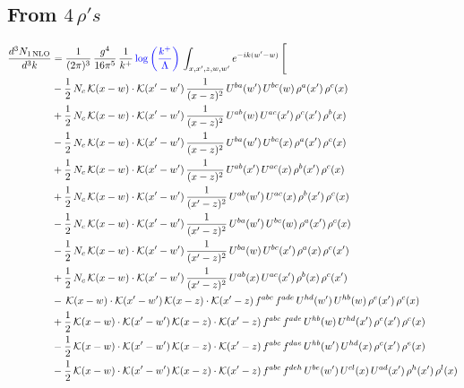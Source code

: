 \documentclass[9pt]{article}
\numberwithin{equation}{section}
\begin{document}
\subsection{From $4\, \rho's$}
\begin{align}
\frac{d^{3}N_{1\,\mathrm{NLO}}}{d^{3}k} & = \frac{1}{(2\pi)^{3}}\,\frac{g^{4}}{16\pi^{5}}\,\frac{1}{k^{+}}\,{\color{blue}\log{\left(\frac{k^{+}}{\Lambda}\right)}}\,\int_{x,x',z,w,w'}e^{-ik(w'-w)}\,\Bigg[\notag\\ & -\frac{1}{2}\,N_{c}\,\mathcal{K}(x-w)\cdot\mathcal{K}(x'-w')\,\frac{1}{(x-z)^{2}}\,U^{ba}(w')\,U^{bc}(w)\,\rho^{a}(x')\,\rho^{c}(x)\notag\\
& +\frac{1}{2}\,N_{c}\,\mathcal{K}(x-w)\cdot\mathcal{K}(x'-w')\,\frac{1}{(x-z)^{2}}\,U^{ab}(w)\,U^{ac}(x')\,\rho^{c}(x')\,\rho^{b}(x)\notag\\
& -\frac{1}{2}\,N_{c}\,\mathcal{K}(x-w)\cdot\mathcal{K}(x'-w')\,\frac{1}{(x-z)^{2}}\,U^{ba}(w')\,U^{bc}(x)\,\rho^{a}(x')\,\rho^{c}(x)\notag\\
& +\frac{1}{2}\,N_{c}\,\mathcal{K}(x-w)\cdot\mathcal{K}(x'-w')\,\frac{1}{(x-z)^{2}}\,U^{ab}(x')\,U^{ac}(x)\,\rho^{b}(x')\,\rho^{c}(x)\notag\\
& +\frac{1}{2}\,N_{c}\,\mathcal{K}(x-w)\cdot\mathcal{K}(x'-w')\,\frac{1}{(x'-z)^{2}}\,U^{ab}(w')\,U^{ac}(x)\,\rho^{b}(x')\,\rho^{c}(x)\notag\\
& -\frac{1}{2}\,N_{c}\,\mathcal{K}(x-w)\cdot\mathcal{K}(x'-w')\,\frac{1}{(x'-z)^{2}}\,U^{ba}(w')\,U^{bc}(w)\,\rho^{a}(x')\,\rho^{c}(x)\notag\\
& -\frac{1}{2}\,N_{c}\,\mathcal{K}(x-w)\cdot\mathcal{K}(x'-w')\,\frac{1}{(x'-z)^{2}}\,U^{ba}(w)\,U^{bc}(x')\,\rho^{a}(x)\,\rho^{c}(x')\notag\\
& +\frac{1}{2}\,N_{c}\,\mathcal{K}(x-w)\cdot\mathcal{K}(x'-w')\,\frac{1}{(x'-z)^{2}}\,U^{ab}(x)\,U^{ac}(x')\,\rho^{b}(x)\,\rho^{c}(x')\notag\\
& -\,\mathcal{K}(x-w)\cdot\mathcal{K}(x'-w')\,\mathcal{K}(x-z)\cdot\mathcal{K}(x'-z)\,f^{abc}\,f^{ade}\,U^{hd}(w')\,U^{hb}(w)\,\rho^{e}(x')\,\rho^{c}(x)\notag\\
& +\frac{1}{2}\,\mathcal{K}(x-w)\cdot\mathcal{K}(x'-w')\,\mathcal{K}(x-z)\cdot\mathcal{K}(x'-z)\,f^{abc}\,f^{ade}\,U^{hb}(w)\,U^{hd}(x')\,\rho^{e}(x')\,\rho^{c}(x)\notag\\
& -\frac{1}{2}\,\mathcal{K}(x-w)\cdot\mathcal{K}(x'-w')\,\mathcal{K}(x-z)\cdot\mathcal{K}(x'-z)\,f^{abc}\,f^{dae}\,U^{hb}(w')\,U^{hd}(x)\,\rho^{c}(x')\,\rho^{e}(x)\notag\\
& -\frac{1}{2}\,\mathcal{K}(x-w)\cdot\mathcal{K}(x'-w')\,\mathcal{K}(x-z)\cdot\mathcal{K}(x'-z)\,f^{abc}\,f^{deh}\,U^{be}(w')\,U^{cl}(x)\,U^{ad}(x')\,\rho^{h}(x')\,\rho^{l}(x)\notag\\

\end{align}
\end{document}
